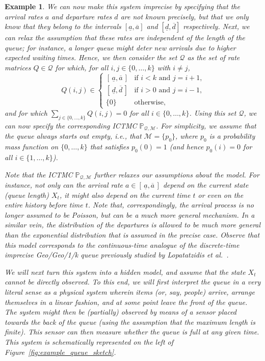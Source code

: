 \documentclass[3p]{elsarticle}
\newtheorem{example}{Example}[section]
\newcommand{\rateset}{\mathcal{Q}}
\begin{document}
\begin{example}
We can now make this system imprecise by specifying that the arrival rates $a$ and departure rates $d$ are not known precisely, but that we only know that they belong to the intervals $[\underline{a},\overline{a}]$ and $[\underline{d},\overline{d}]$ respectively. Next, we can relax the assumption that these rates are independent of the length of the queue; for instance, a longer queue might deter new arrivals due to higher expected waiting times. Hence, we then consider the set $\rateset$ as the set of rate matrices $Q\in\rateset$ for which, for all $i,j\in\{0,\ldots,k\}$ with $i\neq j$,
\begin{equation*}
Q(i,j) \in \left\{\begin{array}{cl}
[\,\underline{a},\overline{a}\,] & \text{if $i<k$ and $j=i+1$,} \\
 \text{$[\,\underline{d},\overline{d}\,]$} & \text{if $i>0$ and $j=i-1$,} \\
\{0\} & \text{otherwise,}
\end{array}\right.
\end{equation*}
and for which $\sum_{j\in\{0,\ldots,k\}}Q(i,j)=0$ for all $i\in\{0,\ldots,k\}$. Using this set $\rateset$, we can now specify the corresponding ICTMC $\mathbb{P}_{\rateset,\mathcal{M}}$. For simplicity, we assume that the queue always starts out empty, i.e., that $\mathcal{M}=\{p_0\}$, where $p_0$ is a probability mass function on $\{0,\ldots,k\}$ that satisfies $p_0(0)=1$ (and hence $p_0(i)=0$ for all $i\in\{1,\ldots,k\}$). 

Note that the ICTMC $\mathbb{P}_{\rateset,\mathcal{M}}$ further relaxes our assumptions about the model. For instance, not only can the arrival rate $a\in[\,\underline{a},\overline{a}\,]$ depend on the current state (queue length) $X_t$, it might also depend on the current time $t$ or even on the entire history before time $t$. Note that, correspondingly, the arrival process is no longer assumed to be Poisson, but can be a much more general mechanism. In a similar vein, the distribution of the departures is allowed to be much more general than the exponential distribution that is assumed in the precise case. Observe that this model corresponds to the continuous-time analogue of the discrete-time imprecise Geo/Geo/1/k queue previously studied by Lopatatzidis \emph{et al.}~\cite{lopatatzidis2016queue}.

We will next turn this system into a \emph{hidden} model, and assume that the state $X_t$ cannot be directly observed. To this end, we will first interpret the queue in a very literal sense as a physical system wherein items (or, say, people) arrive, arrange themselves in a linear fashion, and at some point leave the front of the queue. The system might then be (partially) observed by means of a sensor placed towards the back of the queue (using the assumption that the maximum length is finite). This sensor can then measure whether the queue is full at any given time. This system is schematically represented on the left of Figure~\ref{fig:example_queue_sketch}. 


\end{example}
\end{document}
